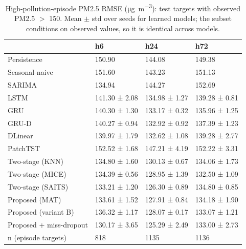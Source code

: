 \begin{table}
\caption{High-pollution-episode PM2.5 RMSE (\si{\micro\gram\per\cubic\metre}): test targets with observed PM2.5 $>$ 150. Mean $\pm$ std over seeds for learned models; the subset conditions on observed values, so it is identical across models.}
\label{tab:episode}
\begin{tabular}{llll}
\toprule
 & h6 & h24 & h72 \\
\midrule
Persistence & 150.90 & 144.08 & 149.38 \\
Seasonal-naive & 151.60 & 143.23 & 151.13 \\
SARIMA & 134.94 & 144.27 & 152.69 \\
LSTM & 141.30 ± 2.08 & 134.98 ± 1.27 & 139.28 ± 0.81 \\
GRU & 140.30 ± 1.30 & 133.17 ± 0.32 & 135.96 ± 1.25 \\
GRU-D & 140.27 ± 0.94 & 132.92 ± 0.92 & 137.39 ± 1.23 \\
DLinear & 139.97 ± 1.79 & 132.62 ± 1.08 & 139.28 ± 2.77 \\
PatchTST & 152.52 ± 1.68 & 147.21 ± 4.19 & 152.22 ± 3.31 \\
Two-stage (KNN) & 134.80 ± 1.60 & 130.13 ± 0.67 & 134.06 ± 1.73 \\
Two-stage (MICE) & 134.39 ± 0.56 & 128.95 ± 1.39 & 132.50 ± 1.09 \\
Two-stage (SAITS) & 133.21 ± 1.20 & 126.30 ± 0.89 & 134.80 ± 0.85 \\
Proposed (MAT) & 133.61 ± 1.52 & 127.91 ± 0.84 & 134.18 ± 1.90 \\
Proposed (variant B) & 136.32 ± 1.17 & 128.07 ± 0.17 & 133.07 ± 1.21 \\
Proposed + miss-dropout & 130.17 ± 3.65 & 125.29 ± 2.49 & 133.00 ± 2.73 \\
n (episode targets) & 818 & 1135 & 1136 \\
\bottomrule
\end{tabular}
\end{table}

